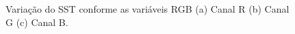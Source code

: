 \begin{figure}[H]
\centering
    \caption{\label{fig:rgb_sst} Variação do SST conforme as variáveis RGB (a) Canal R (b) Canal G (c) Canal B.}
\end{figure}

